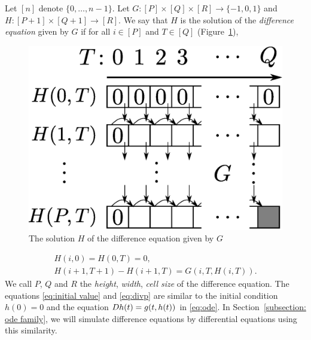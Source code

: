 Let $[n]$ denote $\{0, \dots , n-1\}$.
Let $G \colon [P] \times [Q] \times [R] \to \{-1, 0, 1\}$ and
$H \colon [P + 1] \times [Q+1] \to [R]$. 
We say that $H$ is the solution of the \emph{difference equation} given by $G$
if for all $i \in [P]$ and $T \in [Q]$ (Figure~\ref{fig:divp}), 
\begin{figure}
 \begin{center}
  \includegraphics[height=0.15\textheight]{image/divp.eps}
 \end{center}
 \caption{The solution $H$ of the difference equation given by $G$}
 \label{fig:divp}
\end{figure}
\begin{gather}
   H(i, 0) = H(0, T) = 0, \label{eq:initial value}
\\
   H(i + 1, T + 1) - H(i+1, T) = G(i, T, H(i, T)).  \label{eq:divp}
\end{gather}
We call $P$, $Q$ and $R$ the \emph{height}, \emph{width}, \emph{cell size} of
the difference equation.
The equations \eqref{eq:initial value} and \eqref{eq:divp} are similar to 
the initial condition $h(0) = 0$ and the equation $D h(t) = g(t, h(t))$ 
in \eqref{eq:ode}.
In Section~\ref{subsection: ode family}, we will simulate difference equations by differential equations using this similarity.


